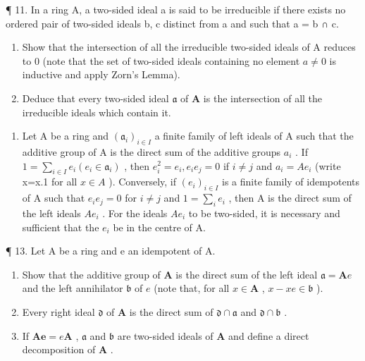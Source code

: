 ¶ 11. In a ring A, a two-sided ideal a is said to be irreducible if there exists no ordered pair of two-sided ideals b, c distinct from a and such that a = b ∩ c.

\begin{enumerate}
\def\labelenumi{(\alph{enumi})}
\item
  Show that the intersection of all the irreducible two-sided ideals of A reduces to 0 (note that the set of two-sided ideals containing no element \(a \neq 0\) is inductive and apply Zorn's Lemma).
\item
  Deduce that every two-sided ideal \(\mathfrak{a}\) of \(\mathbf{A}\) is the intersection of all the irreducible ideals which contain it.
\end{enumerate}

\begin{enumerate}
\def\labelenumi{\arabic{enumi}.}
\setcounter{enumi}{11}
\tightlist
\item
  Let A be a ring and \((\mathfrak{a}_{i})_{i\in I}\) a finite family of left ideals of A such that the additive group of A is the direct sum of the additive groups \(a_{i}\) . If \(1=\sum_{i\in I}e_{i}(e_{i}\in\mathfrak{a}_{i})\) , then \(e_{i}^{2}=e_{i}, e_{i}e_{j}=0\) if \(i\neq j\) and \(a_{i}=Ae_{i}\) (write x=x.1 for all \(x\in A\) ). Conversely, if \((e_{i})_{i\in I}\) is a finite family of idempotents of A such that \(e_{i}e_{j}=0\) for \(i\neq j\) and \(1=\sum_{i}e_{i}\) , then A is the direct sum of the left ideals \(Ae_{i}\) . For the ideals \(Ae_{i}\) to be two-sided, it is necessary and sufficient that the \(e_{i}\) be in the centre of A.
\end{enumerate}

¶ 13. Let A be a ring and e an idempotent of A.

\begin{enumerate}
\def\labelenumi{(\alph{enumi})}
\item
  Show that the additive group of \(\mathbf{A}\) is the direct sum of the left ideal \(\mathfrak{a} = \mathbf{A}e\) and the left annihilator \(\mathfrak{b}\) of \(e\) (note that, for all \(x\in \mathbf{A}\) , \(x - xe\in \mathfrak{b}\) ).
\item
  Every right ideal \(\mathfrak{d}\) of \(\mathbf{A}\) is the direct sum of \(\mathfrak{d} \cap \mathfrak{a}\) and \(\mathfrak{d} \cap \mathfrak{b}\) .
\item
  If \(\mathbf{Ae} = e\mathbf{A}\) , \(\mathfrak{a}\) and \(\mathfrak{b}\) are two-sided ideals of \(\mathbf{A}\) and define a direct decomposition of \(\mathbf{A}\) .
\end{enumerate}

